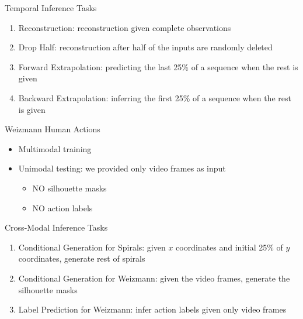 \documentclass{beamer}
\begin{document}
\begin{frame}{Temporal Inference Tasks}
\begin{enumerate}
\item Reconstruction: reconstruction given complete observations
\item Drop Half: reconstruction after half of the inputs are randomly deleted
\item Forward Extrapolation: predicting the last 25\% of a sequence when the rest is given
\item Backward Extrapolation: inferring the first 25\% of a sequence when the rest is given
\end{enumerate}
\end{frame}

\begin{frame}{Weizmann Human Actions}
\begin{itemize}
\item Multimodal training
\item Unimodal testing: we provided only video frames as input
\begin{itemize}
\item NO silhouette masks
\item NO action labels
\end{itemize}
\end{itemize}
\end{frame}

\begin{frame}{Cross-Modal Inference Tasks}
\begin{enumerate}
\item Conditional Generation for Spirals: given $x$ coordinates and initial 25\% of $y$ coordinates, generate rest of spirals
\item Conditional Generation for Weizmann: given the video frames, generate the silhouette masks
\item Label Prediction for Weizmann: infer action labels given only video frames
\end{enumerate}
\end{frame}
\end{document}
